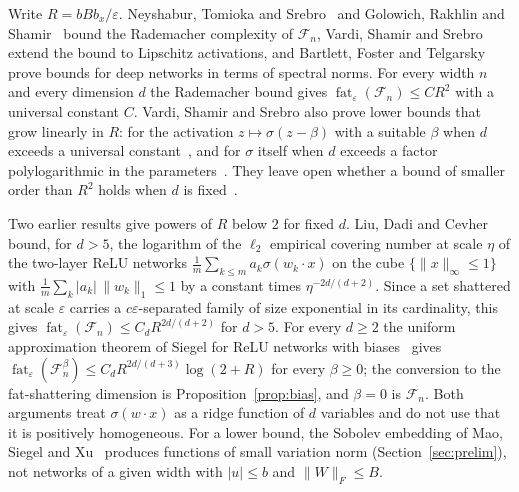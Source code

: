 \documentclass[11pt]{amsart}
\theoremstyle{definition}
\theoremstyle{remark}
\numberwithin{equation}{section}
\newcommand{\cF}{\mathcal{F}}
\newcommand{\fat}{\operatorname{fat}}
\begin{document}
Write $R=bBb_x/\varepsilon$. Neyshabur, Tomioka and Srebro~\cite{NTS} and Golowich, Rakhlin and Shamir~\cite{GRS} bound the Rademacher complexity of $\cF_n$, Vardi, Shamir and Srebro~\cite[Theorem~2]{VSS} extend the bound to Lipschitz activations, and Bartlett, Foster and Telgarsky~\cite{BFT} prove bounds for deep networks in terms of spectral norms. For every width $n$ and every dimension $d$ the Rademacher bound gives $\fat_\varepsilon(\cF_n)\le CR^2$ with a universal constant $C$. Vardi, Shamir and Srebro also prove lower bounds that grow linearly in $R$: for the activation $z\mapsto\sigma(z-\beta)$ with a suitable $\beta$ when $d$ exceeds a universal constant~\cite[Theorem~3]{VSS}, and for $\sigma$ itself when $d$ exceeds a factor polylogarithmic in the parameters~\cite[Corollary~1]{VSS}. They leave open whether a bound of smaller order than $R^2$ holds when $d$ is fixed~\cite[Section~3.2]{VSS}.

Two earlier results give powers of $R$ below $2$ for fixed $d$. Liu, Dadi and Cevher~\cite[Proposition~5]{LDC} bound, for $d>5$, the logarithm of the $\ell_2$ empirical covering number at scale $\eta$ of the two-layer ReLU networks $\frac1m\sum_{k\le m}a_k\sigma(w_k\cdot x)$ on the cube $\{\|x\|_\infty\le1\}$ with $\frac1m\sum_k|a_k|\,\|w_k\|_1\le1$ by a constant times $\eta^{-2d/(d+2)}$. Since a set shattered at scale $\varepsilon$ carries a $c\varepsilon$-separated family of size exponential in its cardinality, this gives $\fat_\varepsilon(\cF_n)\le C_dR^{2d/(d+2)}$ for $d>5$. For every $d\ge2$ the uniform approximation theorem of Siegel for ReLU networks with biases~\cite[Theorem~2]{Siegel} gives $\fat_\varepsilon(\cF_n^{\beta})\le C_dR^{2d/(d+3)}\log(2+R)$ for every $\beta\ge0$; the conversion to the fat-shattering dimension is Proposition~\ref{prop:bias}, and $\beta=0$ is $\cF_n$. Both arguments treat $\sigma(w\cdot x)$ as a ridge function of $d$ variables and do not use that it is positively homogeneous. For a lower bound, the Sobolev embedding of Mao, Siegel and Xu~\cite{MSX} produces functions of small variation norm (Section~\ref{sec:prelim}), not networks of a given width with $|u|\le b$ and $\|W\|_F\le B$.
\end{document}

